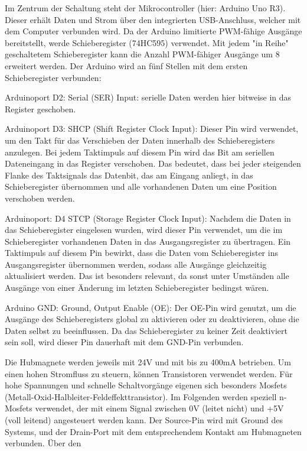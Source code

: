 \documentclass[11pt]{article}
\begin{document}
Im Zentrum der Schaltung steht der Mikrocontroller (hier: Arduino Uno R3).
Dieser erhält Daten und Strom über den integrierten USB-Anschluss, welcher mit dem Computer verbunden wird.
Da der Arduino limitierte PWM-fähige Ausgänge bereitstellt, werde Schieberegister (74HC595) verwendet.
Mit jedem "in Reihe" geschaltetem Schieberegister kann die Anzahl PWM-fähiger Ausgänge um 8 erweitert werden.
Der Arduino wird an fünf Stellen mit dem ersten Schieberegister verbunden:

Arduinoport D2:
Serial (SER) Input: serielle Daten werden hier bitweise in das Register geschoben.

Arduinoport D3:
SHCP (Shift Register Clock Input): Dieser Pin wird verwendet, um den Takt für das Verschieben der Daten innerhalb des Schieberegisters anzulegen.
Bei jedem Taktimpuls auf diesem Pin wird das Bit am seriellen Dateneingang in das Register verschoben.
Das bedeutet, dass bei jeder steigenden Flanke des Taktsignals das Datenbit, das am Eingang anliegt, in das Schieberegister übernommen und alle vorhandenen Daten um eine Position verschoben werden.

Arduinoport: D4
STCP (Storage Register Clock Input): Nachdem die Daten in das Schieberegister eingelesen wurden, wird dieser Pin verwendet, um die im Schieberegister vorhandenen Daten in das Ausgangsregister zu übertragen.
Ein Taktimpuls auf diesem Pin bewirkt, dass die Daten vom Schieberegister ins Ausgangsregister übernommen werden, sodass alle Ausgänge gleichzeitig aktualisiert werden.
Das ist besonders relevant, da sonst unter Umständen alle Ausgänge von einer Änderung im letzten Schieberegister bedingst wären.

Arduino GND:
Ground, Output Enable (OE): Der OE-Pin wird genutzt, um die Ausgänge des Schieberegisters global zu aktivieren oder zu deaktivieren, ohne die Daten selbst zu beeinflussen.
Da das Schieberegister zu keiner Zeit deaktiviert sein soll, wird dieser Pin dauerhaft mit dem GND-Pin verbunden.



Die Hubmagnete werden jeweils mit 24V und mit bis zu 400mA betrieben.
Um einen hohen Stromfluss zu steuern, können Transistoren verwendet werden.
Für hohe Spannungen und schnelle Schaltvorgänge eigenen sich besonders Mosfets (Metall-Oxid-Halbleiter-Feldeffekttransistor).
Im Folgenden werden speziell n-Mosfets verwendet, der mit einem Signal zwischen 0V (leitet nicht) und +5V (voll leitend) angesteuert werden kann.
\n
    Der Source-Pin wird mit Ground des Systems, und der Drain-Port mit dem entsprechendem Kontakt am Hubmagneten verbunden.
    Über den
\end{document}
